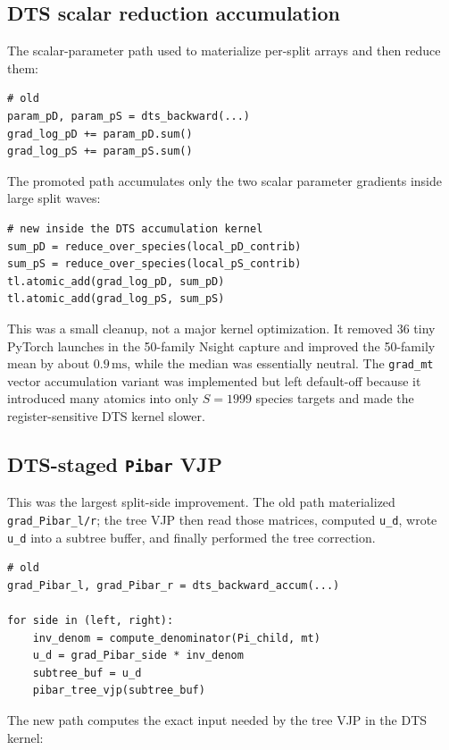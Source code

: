 \documentclass[11pt]{article}
\newcommand{\ms}{\,\mathrm{ms}}
\newcommand{\code}[1]{\texttt{#1}}
\begin{document}
\subsection{DTS scalar reduction accumulation}

The scalar-parameter path used to materialize per-split arrays and then reduce
them:

\begin{lstlisting}
# old
param_pD, param_pS = dts_backward(...)
grad_log_pD += param_pD.sum()
grad_log_pS += param_pS.sum()
\end{lstlisting}

The promoted path accumulates only the two scalar parameter gradients inside
large split waves:

\begin{lstlisting}
# new inside the DTS accumulation kernel
sum_pD = reduce_over_species(local_pD_contrib)
sum_pS = reduce_over_species(local_pS_contrib)
tl.atomic_add(grad_log_pD, sum_pD)
tl.atomic_add(grad_log_pS, sum_pS)
\end{lstlisting}

This was a small cleanup, not a major kernel optimization.  It removed 36 tiny
PyTorch launches in the 50-family Nsight capture and improved the 50-family
mean by about $0.9\ms$, while the median was essentially neutral.  The
\code{grad\_mt} vector accumulation variant was implemented but left
default-off because it introduced many atomics into only $S=1999$ species
targets and made the register-sensitive DTS kernel slower.

\subsection{DTS-staged \code{Pibar} VJP}

This was the largest split-side improvement.  The old path materialized
\code{grad\_Pibar\_l/r}; the tree VJP then read those matrices, computed
\code{u\_d}, wrote \code{u\_d} into a subtree buffer, and finally performed the
tree correction.

\begin{lstlisting}
# old
grad_Pibar_l, grad_Pibar_r = dts_backward_accum(...)

for side in (left, right):
    inv_denom = compute_denominator(Pi_child, mt)
    u_d = grad_Pibar_side * inv_denom
    subtree_buf = u_d
    pibar_tree_vjp(subtree_buf)
\end{lstlisting}

The new path computes the exact input needed by the tree VJP in the DTS kernel:
\end{document}

